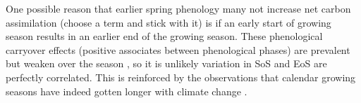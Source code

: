 \documentclass[12 pt]{article}
\begin{document}

One possible reason that earlier spring phenology many not increase net carbon assimilation (choose a term and stick with it) is if an early start of growing season results in an earlier end of the growing season. These phenological carryover effects (positive associates between phenological phases) are prevalent \citep{} but weaken over the season \citep{}, so it is unlikely variation in SoS and EoS are perfectly correlated. This is reinforced by the observations that calendar growing seasons have indeed gotten longer with climate change \citep{}. 


\end{document}
